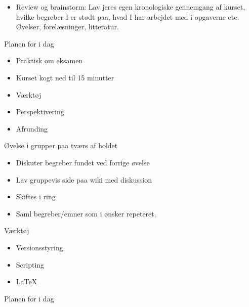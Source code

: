 \documentclass[a4paper,landscape]{slides}
\begin{document}
\begin{slide}
\begin{itemize}
       \item  Review og brainstorm: Lav jeres egen kronologiske gennemgang af kurset, hvilke begreber I er stødt paa, hvad I har arbejdet med i opgaverne etc. Øvelser, forelæsninger, litteratur.
\end{itemize} \end{slide} \begin{slide} \begin{center} {\large 
Planen for i dag
} \end{center} \begin{itemize} \addtolength{\itemsep}{-\baselineskip}
   \item Praktisk om eksamen
   \item Kurset kogt ned til 15 minutter
   \item Værktøj
   \item Perspektivering
   \item Afrunding
\end{itemize} \end{slide} \begin{slide} \begin{center} {\large 
Øvelse i grupper paa tværs af holdet
} \end{center} \begin{itemize} \addtolength{\itemsep}{-\baselineskip}
   \item Diskuter begreber fundet ved forrige øvelse
   \item Lav gruppevis side paa wiki med diskussion
   \item Skiftes i ring
   \item Saml begreber/emner som i ønsker repeteret.
\end{itemize} \end{slide} \begin{slide} \begin{center} {\large 
    Værktøj
} \end{center} \begin{itemize} \addtolength{\itemsep}{-\baselineskip}
       \item  Versionsstyring
       \item  Scripting
       \item  \LaTeX
\end{itemize} \end{slide} \begin{slide} \begin{center} {\large 
Planen for i dag
} \end{center} \begin{itemize} \addtolength{\itemsep}{-\baselineskip}

\end{itemize}
\end{slide}
\end{document}

